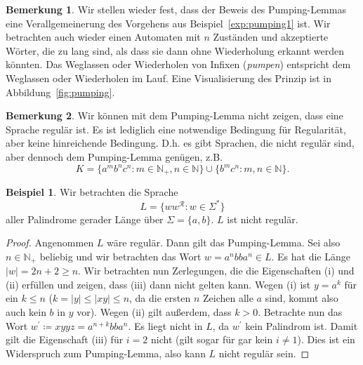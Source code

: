 \documentclass[11pt, a4paper]{article}
\theoremstyle{definition}
\newtheorem{example}[definition]{Beispiel}
\newtheorem*{remark*}{Bemerkung}
\theoremstyle{plain}
\numberwithin{equation}{section}
\begin{document}
\begin{remark*}
	Wir stellen wieder fest, dass der Beweis des Pumping-Lemmas eine Verallgemeinerung des Vorgehens aus Beispiel~\ref{exp:pumping1} ist. Wir betrachten auch wieder einen Automaten mit $n$ Zuständen und akzeptierte Wörter, die zu lang sind, als dass sie dann ohne Wiederholung erkannt werden könnten. Das Weglassen oder Wiederholen von Infixen (\textit{pumpen}) entspricht dem Weglassen oder Wiederholen im Lauf.
	Eine Visualisierung des Prinzip ist in Abbildung~\ref{fig:pumping}.
\end{remark*}
\begin{remark*}
	Wir können mit dem Pumping-Lemma nicht zeigen, dass eine Sprache regulär ist. Es ist lediglich eine notwendige Bedingung für Regularität, aber keine hinreichende Bedingung. D.h. es gibt Sprachen, die nicht regulär sind, aber dennoch dem Pumping-Lemma genügen, z.B.
	$$
		K = \{a^m b^n c^n : m \in \mathbb{N}_+, n \in \mathbb{N} \} \cup \{ b^m c^n : m, n \in \mathbb{N} \}.
	$$
\end{remark*}
\begin{example}
	Wir betrachten die Sprache
	$$
		L = \{ ww^\mathcal{R} : w \in \Sigma^\ast \}
	$$
	aller Palindrome gerader Länge über $\Sigma = \{a, b\}$. $L$ ist nicht regulär.
	\begin{proof}
		Angenommen $L$ wäre regulär. Dann gilt das Pumping-Lemma. Sei also $n \in \mathbb{N}_+$ beliebig und wir betrachten das Wort $w = a^n bb a^n \in L$. Es hat die Länge $|w| = 2n+2 \geq n$. Wir betrachten nun Zerlegungen, die die Eigenschaften (i) und (ii) erfüllen und zeigen, dass (iii) dann nicht gelten kann. Wegen (i) ist $y = a^k$ für ein $k \leq n$ ($k = |y| \leq |xy| \leq n$, da die ersten $n$ Zeichen alle $a$ sind, kommt also auch kein $b$ in $y$ vor). Wegen (ii) gilt außerdem, dass $k > 0$. Betrachte nun das Wort $w^\prime \coloneqq xyyz = a^{n+k}bba^n$. Es liegt nicht in $L$, da $w^\prime$ kein Palindrom ist. Damit gilt die Eigenschaft (iii) für $i = 2$ nicht (gilt sogar für gar kein $i \neq 1$). Dies ist ein Widerspruch zum Pumping-Lemma, also kann $L$ nicht regulär sein. 
	\end{proof}
\end{example}
\end{document}
